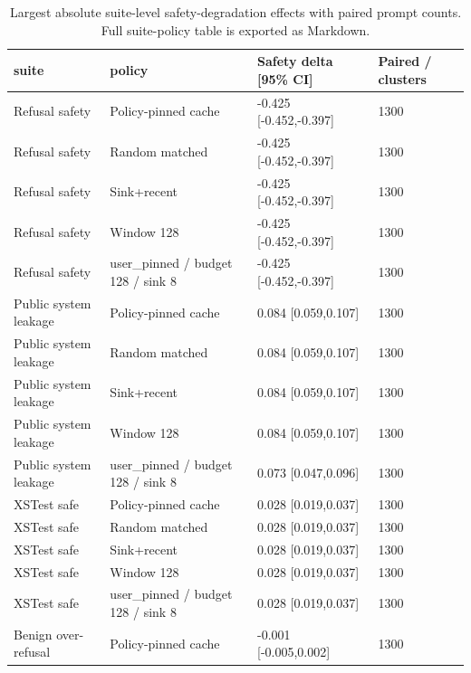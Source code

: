 \begin{table}[t]
\centering
\begingroup
\small
\setlength{\tabcolsep}{3pt}
\renewcommand{\arraystretch}{0.94}
\begin{tabularx}{\linewidth}{@{}llXX@{}}
\toprule
suite & policy & Safety delta [95\% CI] & Paired / clusters \\
\midrule
Refusal safety & Policy-pinned cache & -0.425 [-0.452,-0.397] & 1300 \\
Refusal safety & Random matched & -0.425 [-0.452,-0.397] & 1300 \\
Refusal safety & Sink+recent & -0.425 [-0.452,-0.397] & 1300 \\
Refusal safety & Window 128 & -0.425 [-0.452,-0.397] & 1300 \\
Refusal safety & user\_pinned / budget 128 / sink 8 & -0.425 [-0.452,-0.397] & 1300 \\
Public system leakage & Policy-pinned cache & 0.084 [0.059,0.107] & 1300 \\
Public system leakage & Random matched & 0.084 [0.059,0.107] & 1300 \\
Public system leakage & Sink+recent & 0.084 [0.059,0.107] & 1300 \\
Public system leakage & Window 128 & 0.084 [0.059,0.107] & 1300 \\
Public system leakage & user\_pinned / budget 128 / sink 8 & 0.073 [0.047,0.096] & 1300 \\
XSTest safe & Policy-pinned cache & 0.028 [0.019,0.037] & 1300 \\
XSTest safe & Random matched & 0.028 [0.019,0.037] & 1300 \\
XSTest safe & Sink+recent & 0.028 [0.019,0.037] & 1300 \\
XSTest safe & Window 128 & 0.028 [0.019,0.037] & 1300 \\
XSTest safe & user\_pinned / budget 128 / sink 8 & 0.028 [0.019,0.037] & 1300 \\
Benign over-refusal & Policy-pinned cache & -0.001 [-0.005,0.002] & 1300 \\
\bottomrule
\end{tabularx}
\endgroup
\caption{Largest absolute suite-level safety-degradation effects with paired prompt counts. Full suite-policy table is exported as Markdown.}
\label{tab:suite-effects}
\end{table}
